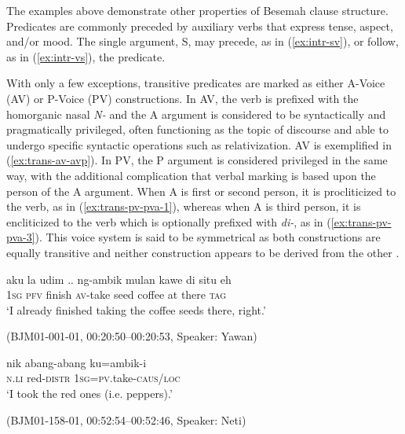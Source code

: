 \documentclass[output=paper,
\ChapterDOI{10.5281/zenodo.15697583}
colorlinks,
citecolor=brown]{langscibook}
\begin{document}
The examples above demonstrate other properties of Besemah clause structure. Predicates are commonly preceded by auxiliary verbs that express tense, aspect, and/or mood. The single argument, S, may precede, as in (\ref{ex:intr-sv}), or follow, as in (\ref{ex:intr-vs}), the predicate.

With only a few exceptions, transitive predicates are marked as either A-Voice (AV) or P-Voice (PV) constructions. In AV, the verb is prefixed with the homorganic nasal \textit{N-} and the A argument is considered to be syntactically and pragmatically privileged, often functioning as the topic of discourse and able to undergo specific syntactic operations such as relativization. AV is exemplified in (\ref{ex:trans-av-avp}). In PV, the P argument is considered privileged in the same way, with the additional complication that verbal marking is based upon the person of the A argument. When A is first or second person, it is procliticized to the verb, as in (\ref{ex:trans-pv-pva-1}), whereas when A is third person, it is encliticized to the verb which is optionally prefixed with \textit{di-}, as in (\ref{ex:trans-pv-pva-3}). This voice system is said to be symmetrical as both constructions are equally transitive and neither construction appears to be derived from the other \citep{himmelmann2005austronesian,riesberg2014symmetrical,chen2019western}.

\begin{exe}
    \ex\label{ex:trans-av-avp} 
    \begin{xlist}
        \exi{}
        \gll aku la udim .. ng-ambik mulan kawe di situ eh\\
        1\textsc{sg} \textsc{pfv} finish {} \textsc{av}-take seed coffee at there \textsc{tag}\\
        \trans `I already finished taking the coffee seeds there, right.'
    \end{xlist}
    \hfill (BJM01-001-01, 00:20:50–00:20:53, Speaker: Yawan)
\end{exe}

\begin{exe}
    \ex\label{ex:trans-pv-pva-1} 
    \begin{xlist}
        \exi{}
        \gll nik abang-abang ku=ambik-i\\
        \textsc{n.li} red-\textsc{distr} 1\textsc{sg}=\textsc{pv}.take-\textsc{caus/loc}\\
        \trans `I took the red ones (i.e. peppers).'
    \end{xlist}
    \hfill (BJM01-158-01, 00:52:54–00:52:46, Speaker: Neti)
\end{exe}
\end{document}
